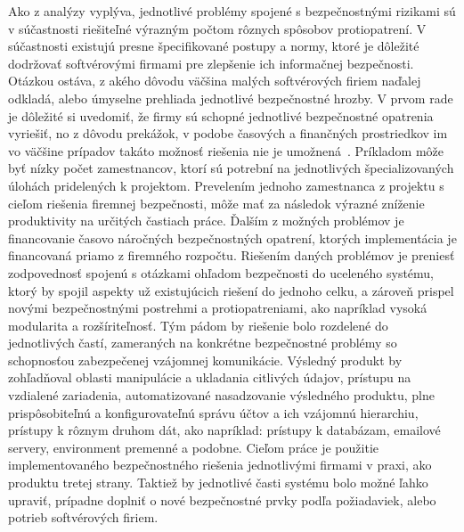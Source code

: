 Ako z analýzy vyplýva, jednotlivé problémy spojené s bezpečnostnými rizikami sú v súčastnosti riešiteľné výrazným počtom
rôznych spôsobov protiopatrení.
V súčastnosti existujú presne špecifikované postupy a normy, ktoré je dôležité dodržovať softvérovými firmami pre zlepšenie
ich informačnej bezpečnosti.
Otázkou ostáva, z akého dôvodu väčšina malých softvérových firiem naďalej odkladá, alebo úmyselne prehliada jednotlivé bezpečnostné hrozby.
V prvom rade je dôležité si uvedomiť, že firmy sú schopné jednotlivé bezpečnostné opatrenia vyriešiť, no z dôvodu
prekážok, v podobe časových a finančných prostriedkov im vo väčšine prípadov takáto možnosť riešenia nie je umožnená~\cite{CompanySecurity}.
Príkladom môže byť nízky počet zamestnancov, ktorí sú potrební na jednotlivých špecializovaných úlohách pridelených k projektom.
Prevelením jednoho zamestnanca z projektu s cieľom riešenia firemnej bezpečnosti, môže mať za následok výrazné zníženie
produktivity na určitých častiach práce.
Ďalším z možných problémov je financovanie časovo náročných bezpečnostných opatrení, ktorých implementácia je financovaná
priamo z firemného rozpočtu.
Riešením daných problémov je preniesť zodpovednosť spojenú s otázkami ohľadom bezpečnosti do uceleného systému, ktorý by
spojil aspekty už existujúcich riešení do jednoho celku, a zároveň prispel novými bezpečnostnými postrehmi a protiopatreniami,
ako napríklad vysoká modularita a rozšíriteľnosť.
Tým pádom by riešenie bolo rozdelené do jednotlivých častí, zameraných na konkrétne bezpečnostné problémy so schopnosťou
zabezpečenej vzájomnej komunikácie.
Výsledný produkt by zohľadňoval oblasti manipulácie a ukladania citlivých údajov, prístupu na vzdialené zariadenia,
automatizované nasadzovanie výsledného produktu, plne prispôsobiteľnú a konfigurovateľnú správu účtov a ich vzájomnú
hierarchiu, prístupy k rôznym druhom dát, ako napríklad: prístupy k databázam, emailové servery, environment premenné a
podobne.
Cieľom práce je použitie implementovaného bezpečnostného riešenia jednotlivými firmami v praxi, ako produktu tretej strany.
Taktiež by jednotlivé časti systému bolo možné ľahko upraviť, prípadne doplniť o nové bezpečnostné prvky podľa požiadaviek, alebo
potrieb softvérových firiem.
